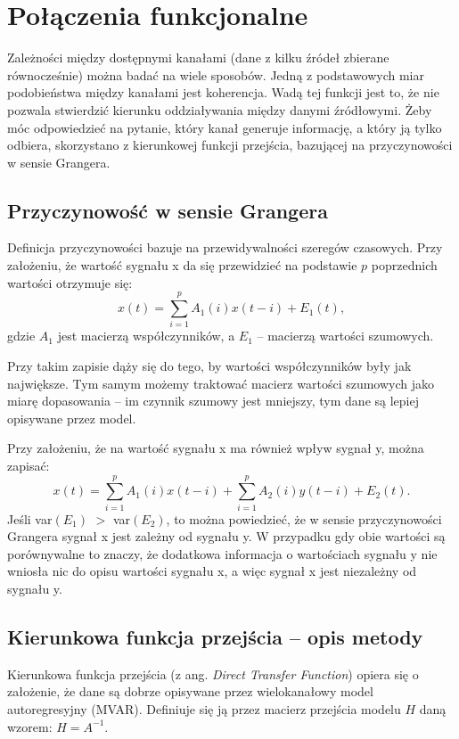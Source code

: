 \documentclass{pracamgr_2}
\begin{document}
\section{Połączenia funkcjonalne}
Zależności między dostępnymi kanałami (dane z kilku źródeł zbierane równocześnie) można badać na wiele sposobów. Jedną z podstawowych miar podobieństwa między kanałami jest koherencja. Wadą tej funkcji jest to, że nie pozwala stwierdzić kierunku oddziaływania między danymi źródłowymi. Żeby móc odpowiedzieć na pytanie, który kanał generuje informację, a który ją tylko odbiera, skorzystano z kierunkowej funkcji przejścia, bazującej na przyczynowości w sensie Grangera.

\subsection{Przyczynowość w sensie Grangera}
Definicja przyczynowości bazuje na przewidywalności szeregów czasowych. Przy założeniu, że wartość sygnału x da się przewidzieć na podstawie $p$ poprzednich wartości otrzymuje się:
\begin{equation}
x(t) = \sum_{i=1}^{p}A_1(i)x(t-i)+E_1(t),
\end{equation}
gdzie $A_1$ jest macierzą współczynników, a $E_1$ -- macierzą wartości szumowych.

Przy takim zapisie dąży się do tego, by wartości współczynników były jak największe. Tym samym możemy traktować macierz wartości szumowych jako miarę dopasowania -- im czynnik szumowy jest mniejszy, tym dane są lepiej opisywane przez model.
	
Przy założeniu, że na wartość sygnału x ma również wpływ sygnał y, można zapisać:
\begin{equation}
x(t) = \sum_{i=1}^{p}A_1(i)x(t-i)+\sum_{i=1}^{p}A_2(i)y(t-i)+E_2(t).
\end{equation}
Jeśli var$(E_1)$ $>$ var$(E_2)$, to można powiedzieć, że w sensie przyczynowości Grangera sygnał x jest zależny od sygnału y. W przypadku gdy obie wartości są porównywalne to znaczy, że dodatkowa informacja o wartościach sygnału y nie wniosła nic do opisu wartości sygnału x, a więc sygnał x jest niezależny od sygnału y.
\subsection{Kierunkowa funkcja przejścia -- opis metody}
Kierunkowa funkcja przejścia (z ang. \textit{Direct Transfer Function}) opiera się o założenie, że dane są dobrze opisywane przez wielokanałowy model autoregresyjny (MVAR). Definiuje się ją przez macierz przejścia modelu $H$ daną wzorem: $H = A^{-1}$.
\end{document}
